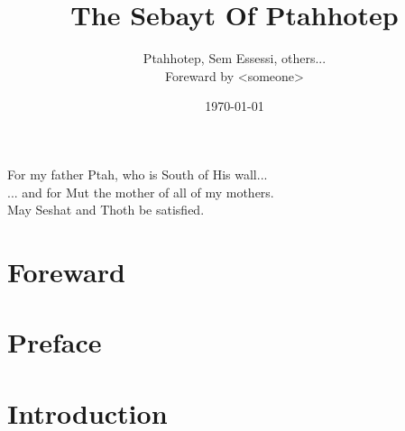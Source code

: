 \documentclass[a4paper,pagesize,8pt,pointlessnumbers,normalheadings]{book}
\title{The Sebayt Of Ptahhotep}
\author{Ptahhotep, Sem Essessi, others...\\Foreward by <someone>}
\date{\today}
\begin{document}
\maketitle


\vspace*{\fill}
\begin{center}
For my father Ptah, who is South of His wall...\\
\vspace{7.5mm}
... and for Mut the mother of all of my mothers.\\
\vspace{15mm}
May Seshat and Thoth be satisfied.\\
\end{center}
\vspace*{\fill}

\tableofcontents

\markboth{}{}


\chapter*{Foreward}

\markboth{}{}

\chapter*{Preface}

\markboth{}{}

\chapter*{Introduction}

\end{document}

